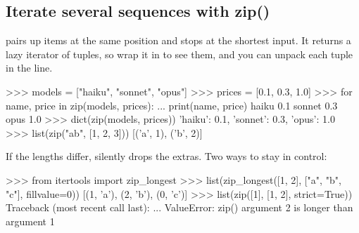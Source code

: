 \subsection{Iterate several sequences with zip()}

 pairs up items at the same position and stops at the shortest input. It returns a
lazy iterator of tuples, so wrap it in  to see them, and you can unpack each tuple in the
 line.

\begin{center}
\end{center}

\begin{pycode}
>>> models = ["haiku", "sonnet", "opus"]
>>> prices = [0.1, 0.3, 1.0]
>>> for name, price in zip(models, prices):
...     print(name, price)
haiku 0.1
sonnet 0.3
opus 1.0
>>> dict(zip(models, prices))
{'haiku': 0.1, 'sonnet': 0.3, 'opus': 1.0}
>>> list(zip("ab", [1, 2, 3]))
[('a', 1), ('b', 2)]
\end{pycode}

If the lengths differ,  silently drops the extras. Two ways to stay in control:

\begin{pycode}
>>> from itertools import zip_longest
>>> list(zip_longest([1, 2], ["a", "b", "c"], fillvalue=0))
[(1, 'a'), (2, 'b'), (0, 'c')]
>>> list(zip([1], [1, 2], strict=True))
Traceback (most recent call last):
  ...
ValueError: zip() argument 2 is longer than argument 1
\end{pycode}

